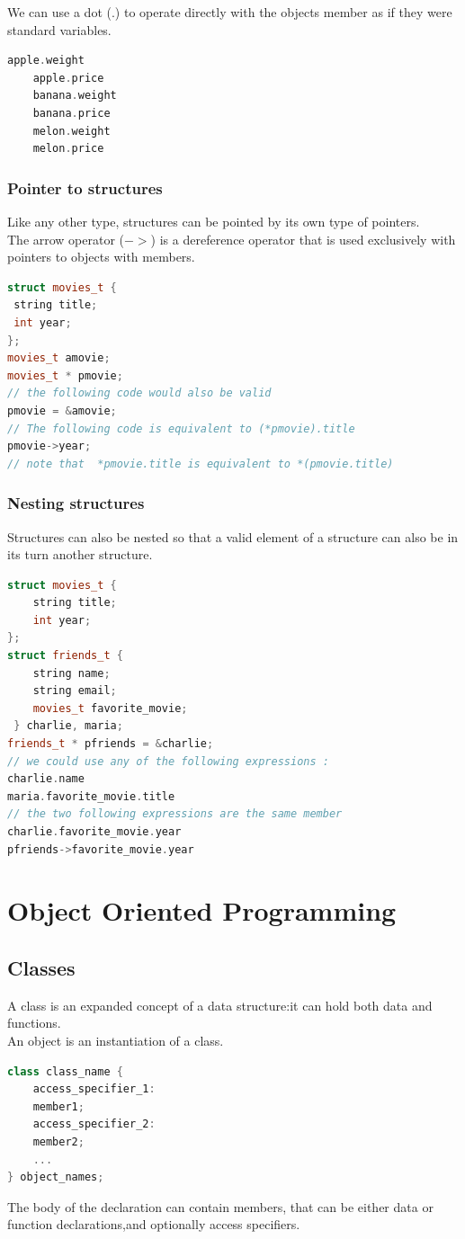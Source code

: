 \documentclass[12pt,oneside]{book}
\begin{document}
We can use a dot (.) to operate directly with the objects member as if they were standard variables.
	\begin{lstlisting}[language=C++]
    apple.weight 
    apple.price 
    banana.weight
    banana.price 
    melon.weight 
    melon.price 
\end{lstlisting}
\subsection{Pointer to structures}
Like any other type, structures can be pointed by its own type of pointers.\\
The arrow operator ($->$) is a dereference operator that is used exclusively with pointers to objects with members.\\
\begin{lstlisting}[language=C++]
struct movies_t { 
 string title; 
 int year; 
}; 
movies_t amovie; 
movies_t * pmovie;
// the following code would also be valid 
pmovie = &amovie;
// The following code is equivalent to (*pmovie).title
pmovie->year; 
// note that  *pmovie.title is equivalent to *(pmovie.title)
\end{lstlisting}
\subsection{Nesting structures}
Structures can also be nested so that a valid element of a structure can also be in its turn another structure.
	\begin{lstlisting}[language=C++]
struct movies_t { 
    string title; 
    int year; 
}; 
struct friends_t { 
    string name; 
    string email; 
    movies_t favorite_movie; 
 } charlie, maria; 
friends_t * pfriends = &charlie;
// we could use any of the following expressions :
charlie.name 
maria.favorite_movie.title 
// the two following expressions are the same member
charlie.favorite_movie.year 
pfriends->favorite_movie.year
\end{lstlisting}



\chapter{Object Oriented Programming}
\section{Classes}
A class is an expanded concept of a data structure:it can hold both data and functions.\\
An object is an instantiation of a class.
	\begin{lstlisting}[language=C++]
class class_name { 
    access_specifier_1: 
    member1; 
    access_specifier_2: 
    member2; 
    ... 
} object_names;
\end{lstlisting}
The body of the declaration can contain members, that can be either data or function declarations,and optionally access specifiers.\\
\end{document}
